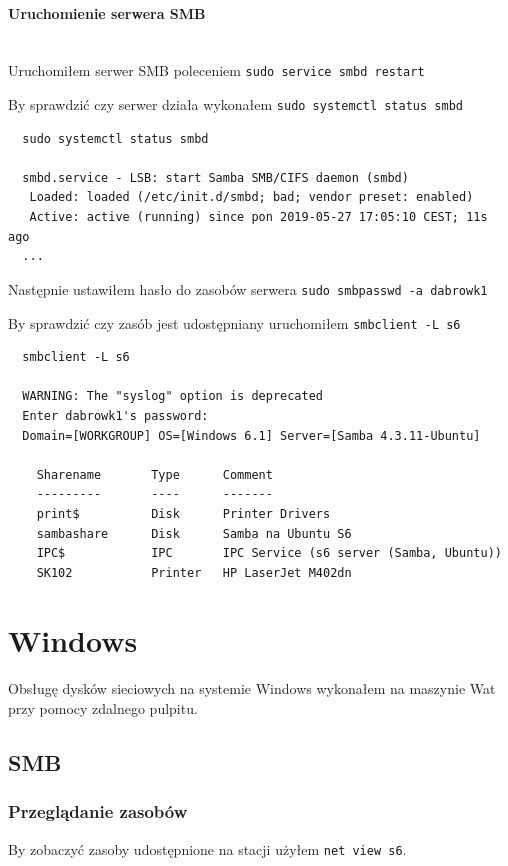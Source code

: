 \documentclass{article} %
\begin{document}
\paragraph{Uruchomienie serwera SMB} \mbox{} \\
Uruchomiłem serwer SMB poleceniem \texttt{sudo service smbd restart}

By sprawdzić czy serwer działa wykonałem \texttt{sudo systemctl status smbd}
\begin{verbatim}
  sudo systemctl status smbd

  smbd.service - LSB: start Samba SMB/CIFS daemon (smbd)
   Loaded: loaded (/etc/init.d/smbd; bad; vendor preset: enabled)
   Active: active (running) since pon 2019-05-27 17:05:10 CEST; 11s ago
  ...
\end{verbatim}

Następnie ustawiłem hasło do zasobów serwera \texttt{sudo smbpasswd -a dabrowk1}

By sprawdzić czy zasób jest udostępniany uruchomiłem \texttt{smbclient -L s6}
\begin{verbatim}
  smbclient -L s6  

  WARNING: The "syslog" option is deprecated
  Enter dabrowk1's password: 
  Domain=[WORKGROUP] OS=[Windows 6.1] Server=[Samba 4.3.11-Ubuntu]

	Sharename       Type      Comment
	---------       ----      -------
	print$          Disk      Printer Drivers
	sambashare      Disk      Samba na Ubuntu S6
	IPC$            IPC       IPC Service (s6 server (Samba, Ubuntu))
	SK102           Printer   HP LaserJet M402dn
\end{verbatim}

\section{Windows}
Obsługę dysków sieciowych na systemie Windows wykonałem na maszynie Wat przy pomocy zdalnego pulpitu.

\subsection{SMB}

\subsubsection{Przeglądanie zasobów}
By zobaczyć zasoby udostępnione na stacji użyłem \texttt{net view s6}.
\end{document}

